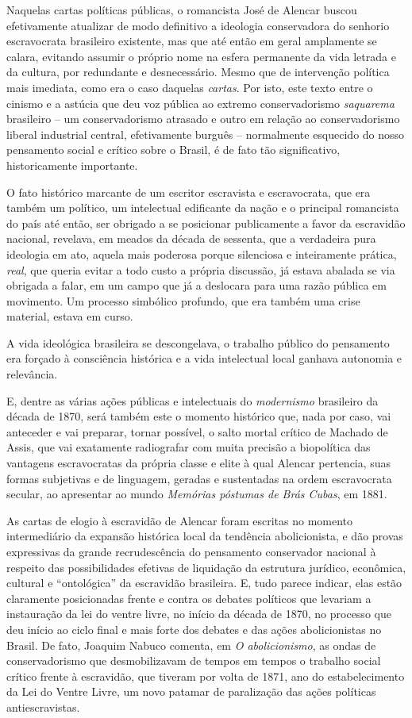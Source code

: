 Naquelas cartas políticas públicas, o romancista José de Alencar buscou
efetivamente atualizar de modo definitivo a ideologia conservadora do
senhorio escravocrata brasileiro existente, mas que até então em geral
amplamente se calara, evitando assumir o próprio nome na esfera
permanente da vida letrada e da cultura, por redundante e desnecessário.
Mesmo que de intervenção política mais imediata, como era o caso
daquelas \emph{cartas}. Por isto, este texto entre o cinismo e a astúcia
que deu voz pública ao extremo conservadorismo \emph{saquarema}
brasileiro -- um conservadorismo atrasado e outro em relação ao
conservadorismo liberal industrial central, efetivamente burguês --
normalmente esquecido do nosso pensamento social e crítico sobre o
Brasil, é de fato tão significativo, historicamente importante.

O fato histórico marcante de um escritor escravista e escravocrata, que
era também um político, um intelectual edificante da nação e o principal
romancista do país até então, ser obrigado a se posicionar publicamente
a favor da escravidão nacional, revelava, em meados da década de
sessenta, que a verdadeira pura ideologia em ato, aquela mais poderosa
porque silenciosa e inteiramente prática, \emph{real}, que queria evitar
a todo custo a própria discussão, já estava abalada se via obrigada a
falar, em um campo que já a deslocara para uma razão pública em
movimento. Um processo simbólico profundo, que era também uma crise
material, estava em curso.

A vida ideológica brasileira se descongelava, o trabalho público do
pensamento era forçado à consciência histórica e a vida intelectual
local ganhava autonomia e relevância.

E, dentre as várias ações públicas e intelectuais do \emph{modernismo}
brasileiro da década de 1870, será também este o momento histórico que,
nada por caso, vai anteceder e vai preparar, tornar possível, o salto
mortal crítico de Machado de Assis, que vai exatamente radiografar com
muita precisão a biopolítica das vantagens escravocratas da própria
classe e elite à qual Alencar pertencia, suas formas subjetivas e de
linguagem, geradas e sustentadas na ordem escravocrata secular, ao
apresentar ao mundo \emph{Memórias póstumas de Brás Cubas}, em 1881.

As cartas de elogio à escravidão de Alencar foram escritas no momento
intermediário da expansão histórica local da tendência abolicionista, e
dão provas expressivas da grande recrudescência do pensamento
conservador nacional à respeito das possibilidades efetivas de
liquidação da estrutura jurídico, econômica, cultural e ``ontológica''
da escravidão brasileira. E, tudo parece indicar, elas estão claramente
posicionadas frente e contra os debates políticos que levariam a
instauração da lei do ventre livre, no início da década de 1870, no
processo que deu início ao ciclo final e mais forte dos debates e das
ações abolicionistas no Brasil. De fato, Joaquim Nabuco comenta, em
\emph{O abolicionismo}, as ondas de conservadorismo que desmobilizavam
de tempos em tempos o trabalho social crítico frente à escravidão, que
tiveram por volta de 1871, ano do estabelecimento da Lei do Ventre
Livre, um novo patamar de paralização das ações políticas
antiescravistas.

